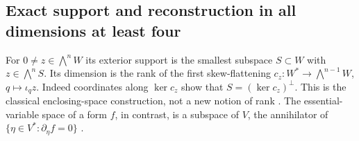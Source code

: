 \subsection{Exact support and reconstruction in all dimensions at least four}

For \(0\ne z\in\bigwedge^nW\) its exterior support is the smallest
subspace \(S\subset W\) with \(z\in\bigwedge^n S\).  Its dimension
is the rank of the first skew-flattening
\(c_z:W^*\to\bigwedge^{n-1}W\), \(q\mapsto\iota_qz\).
Indeed coordinates along \(\ker c_z\) show that
\(S=(\ker c_z)^\perp\).  This is the classical enclosing-space
construction, not a new notion of rank
\cite[\S10.1]{LandsbergOttaviani}\cite[\S2.4]{Sheridan}.
The essential-variable space of a form \(f\), in contrast, is a
subspace of \(V\), the annihilator of
\(\{\eta\in V^*: \partial_\eta f=0\}\) \cite{Carlini}.

